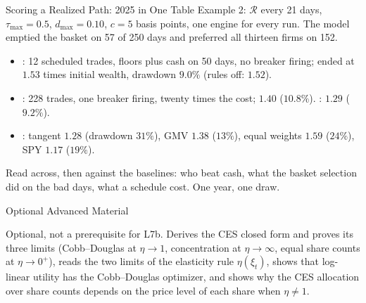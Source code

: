 \documentclass[aspectratio=169,11pt]{beamer}
\newcommand{\Rset}{\mathcal{R}}
\begin{document}
\begin{frame}{Scoring a Realized Path: 2025 in One Table}
  Example 2: $\Rset$ every 21 days, $\tau_{\max}=0.5$, $d_{\max}=0.10$, $c=5$
  basis points, one engine for every run. The model emptied the basket on 57 of
  250 days and preferred all thirteen firms on 152.
  \begin{itemize}\setlength{\itemsep}{0.35em}
    \item {}: 12 scheduled trades, floors plus cash on
      50 days, no breaker firing; ended at $1.53$ times initial wealth, drawdown
      $9.0\%$ (rules off: $1.52$).
    \item {}: 228 trades, one breaker firing, twenty
      times the cost; $1.40$ ($10.8\%$). :
      $1.29$ ($9.2\%$).
    \item {}: tangent $1.28$ (drawdown $31\%$), GMV $1.38$
      ($13\%$), equal weights $1.59$ ($24\%$), SPY $1.17$ ($19\%$).
  \end{itemize}
  Read across, then against the baselines: who beat cash, what the basket
  selection did on the bad days, what a schedule cost. One year, one draw.
\end{frame}

\begin{frame}{Optional Advanced Material}
  \vspace{0.4em}
  {\normalsize\textbf{} \par
  }

  \vspace{0.7em}
  Optional, not a prerequisite for L7b. Derives the CES closed form and proves its
  three limits (Cobb--Douglas at $\eta\to1$, concentration at $\eta\to\infty$,
  equal share counts at $\eta\to0^+$), reads the two limits of the elasticity
  rule $\eta(\xi_t)$, shows that log-linear utility has the Cobb--Douglas
  optimizer, and shows why the CES allocation over share counts depends on the
  price level of each share when $\eta\ne1$.
\end{frame}
\end{document}
